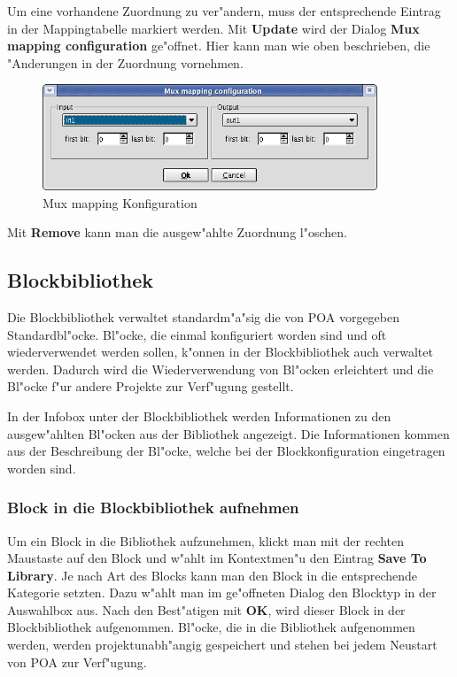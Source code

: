 \documentclass[a4paper,titlepage,12pt,ngerman]{scrbook}
\begin{document}
Um eine vorhandene Zuordnung zu ver"andern, muss der entsprechende Eintrag in der Mappingtabelle markiert werden.\newline
Mit {\bf Update} wird der Dialog {\bf Mux mapping configuration} ge"offnet. Hier kann man wie oben beschrieben, die "Anderungen in der Zuordnung vornehmen.\newline

\begin{figure}[htbp]

\begin{center}

\includegraphics[width=10cm]{Muxzuordnung}

\caption{Mux mapping Konfiguration}\label{test}

\end{center}

\end{figure}

Mit {\bf Remove} kann man die ausgew"ahlte Zuordnung l"oschen.\par


\subsection{Blockbibliothek}
Die Blockbibliothek verwaltet standardm"a"sig die von POA vorgegeben Standardbl"ocke.
Bl"ocke, die einmal konfiguriert worden sind und oft wiederverwendet werden sollen, 
k"onnen in der Blockbibliothek auch verwaltet werden. Dadurch wird die Wiederverwendung
von Bl"ocken erleichtert und die Bl"ocke f"ur andere Projekte zur Verf"ugung gestellt.\par
In der Infobox unter der Blockbibliothek werden Informationen zu den ausgew"ahlten Bl"ocken aus der Bibliothek angezeigt. Die Informationen kommen aus der Beschreibung der Bl"ocke, welche bei der Blockkonfiguration eingetragen worden sind.
\subsubsection{Block in die Blockbibliothek aufnehmen}
Um ein Block in die Bibliothek aufzunehmen, klickt man mit der rechten Maustaste
auf den Block und w"ahlt im Kontextmen"u den Eintrag {\bf Save To Library}. Je nach Art des Blocks kann man den Block in die entsprechende Kategorie setzten. Dazu w"ahlt man im ge"offneten Dialog den Blocktyp in der Auswahlbox aus. Nach den Best"atigen mit {\bf OK}, wird dieser Block in der Blockbibliothek aufgenommen.\newline
Bl"ocke, die in die Bibliothek aufgenommen werden, werden projektunabh"angig gespeichert
und stehen bei jedem Neustart von POA zur Verf"ugung.
\end{document}

